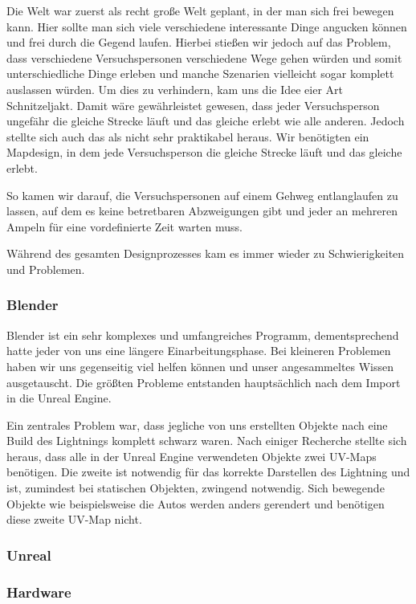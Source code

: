 \documentclass{Bericht}
\begin{document}
\newpage
		Die Welt war zuerst als recht große Welt geplant, in der man sich frei bewegen kann. Hier sollte man sich viele verschiedene interessante Dinge angucken können und frei durch die Gegend laufen. Hierbei stießen wir jedoch auf das Problem, dass verschiedene Versuchspersonen verschiedene Wege gehen würden und somit unterschiedliche Dinge erleben und manche Szenarien vielleicht sogar komplett auslassen würden. Um dies zu verhindern, kam uns die Idee eier Art Schnitzeljakt. Damit wäre gewährleistet gewesen, dass jeder Versuchsperson ungefähr die gleiche Strecke läuft und das gleiche erlebt wie alle anderen. Jedoch stellte sich auch das als nicht sehr praktikabel heraus. Wir benötigten ein Mapdesign, in dem jede Versuchsperson die gleiche Strecke läuft und das gleiche erlebt.

		So kamen wir darauf, die Versuchspersonen auf einem Gehweg entlanglaufen zu lassen, auf dem es keine betretbaren Abzweigungen gibt und jeder an mehreren Ampeln für eine vordefinierte Zeit warten muss. 
		
		Während des gesamten Designprozesses kam es immer wieder zu Schwierigkeiten und Problemen.
		
		\subsubsection{Blender}
			Blender ist ein sehr komplexes und umfangreiches Programm, dementsprechend hatte jeder von uns eine längere Einarbeitungsphase. Bei kleineren Problemen haben wir uns gegenseitig viel helfen können und unser angesammeltes Wissen ausgetauscht. Die größten Probleme entstanden hauptsächlich nach dem Import in die Unreal Engine. 
			
			Ein zentrales Problem war, dass jegliche von uns erstellten Objekte nach eine Build des Lightnings komplett schwarz waren. Nach einiger Recherche stellte sich heraus, dass alle in der Unreal Engine verwendeten Objekte zwei UV-Maps benötigen. Die zweite ist notwendig für das korrekte Darstellen des Lightning und ist, zumindest bei statischen Objekten, zwingend notwendig. Sich bewegende Objekte wie beispielsweise die Autos werden anders gerendert und benötigen diese zweite UV-Map nicht. 
		
		\subsubsection{Unreal}
		
		\subsubsection{Hardware}
		
\end{document}

